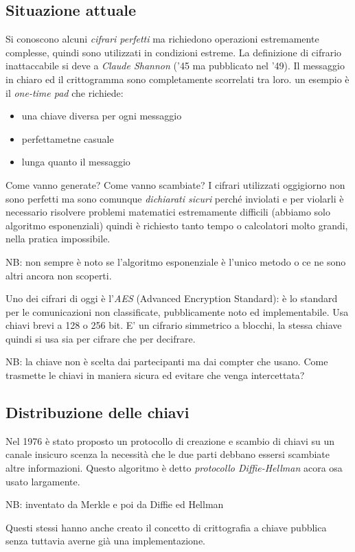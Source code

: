 \subsection{Situazione attuale}
Si conoscono alcuni \emph{cifrari perfetti} ma richiedono operazioni estremamente complesse, quindi sono utilizzati in condizioni estreme. La definizione di cifrario inattaccabile si deve a \emph{Claude Shannon} ('45 ma pubblicato nel '49). Il messaggio in chiaro ed il crittogramma sono completamente scorrelati tra loro. un esempio è il \emph{one-time pad} che richiede:
\begin{itemize}
    \item una chiave diversa per ogni messaggio
    \item perfettametne casuale
    \item lunga quanto il messaggio
\end{itemize}
Come vanno generate? Come vanno scambiate?
I cifrari utilizzati oggigiorno non sono perfetti ma sono comunque \emph{dichiarati sicuri} perché inviolati e per violarli è necessario risolvere problemi matematici estremamente difficili (abbiamo solo algoritmo esponenziali) quindi è richiesto tanto tempo o calcolatori molto grandi, nella pratica impossibile.

NB: non sempre è noto se l'algoritmo esponenziale è l'unico metodo o ce ne sono altri ancora non scoperti.

Uno dei cifrari di oggi è l'\emph{AES} (Advanced Encryption Standard): è lo standard per le comunicazioni non classificate, pubblicamente noto ed implementabile. Usa chiavi brevi a 128 o 256 bit. E' un cifrario simmetrico a blocchi, la stessa chiave quindi si usa sia per cifrare che per decifrare.

NB: la chiave non è scelta dai partecipanti ma dai compter che usano.
Come trasmette le chiavi in maniera sicura ed evitare che venga intercettata?

\subsection{Distribuzione delle chiavi}
Nel 1976 è stato proposto un protocollo di creazione e scambio di chiavi su un canale insicuro scenza la necessità che le due parti debbano essersi scambiate altre informazioni. Questo algoritmo è detto \emph{protocollo Diffie-Hellman} acora osa usato largamente.

NB: inventato da Merkle e poi da Diffie ed Hellman

Questi stessi hanno anche creato il concetto di crittografia a chiave pubblica senza tuttavia averne già una implementazione.

